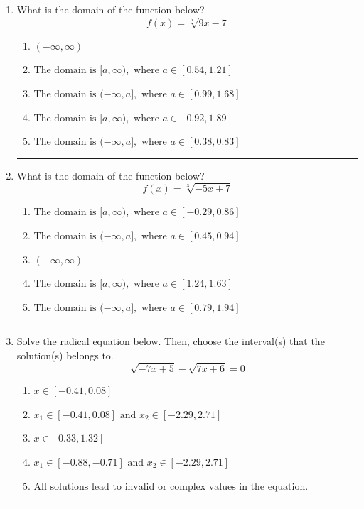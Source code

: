 \documentclass[14pt]{extbook}
\newcommand{\litem}[1]{\item#1\hspace*{-1cm}\rule{\textwidth}{0.4pt}}
\begin{document}
\begin{enumerate}
{\begin{enumerate}[label=\Alph*.]
\end{enumerate} }
\litem{
What is the domain of the function below?\[ f(x) = \sqrt[5]{9 x - 7} \]\begin{enumerate}[label=\Alph*.]
\item \( (-\infty, \infty) \)
\item \( \text{The domain is } [a, \infty), \text{   where } a \in [0.54, 1.21] \)
\item \( \text{The domain is } (-\infty, a], \text{   where } a \in [0.99, 1.68] \)
\item \( \text{The domain is } [a, \infty), \text{   where } a \in [0.92, 1.89] \)
\item \( \text{The domain is } (-\infty, a], \text{   where } a \in [0.38, 0.83] \)

\end{enumerate} }
\litem{
What is the domain of the function below?\[ f(x) = \sqrt[3]{-5 x + 7} \]\begin{enumerate}[label=\Alph*.]
\item \( \text{The domain is } [a, \infty), \text{   where } a \in [-0.29, 0.86] \)
\item \( \text{The domain is } (-\infty, a], \text{   where } a \in [0.45, 0.94] \)
\item \( (-\infty, \infty) \)
\item \( \text{The domain is } [a, \infty), \text{   where } a \in [1.24, 1.63] \)
\item \( \text{The domain is } (-\infty, a], \text{   where } a \in [0.79, 1.94] \)

\end{enumerate} }
\litem{
Solve the radical equation below. Then, choose the interval(s) that the solution(s) belongs to.\[ \sqrt{-7 x + 5} - \sqrt{7 x + 6} = 0 \]\begin{enumerate}[label=\Alph*.]
\item \( x \in [-0.41,0.08] \)
\item \( x_1 \in [-0.41, 0.08] \text{ and } x_2 \in [-2.29,2.71] \)
\item \( x \in [0.33,1.32] \)
\item \( x_1 \in [-0.88, -0.71] \text{ and } x_2 \in [-2.29,2.71] \)
\item \( \text{All solutions lead to invalid or complex values in the equation.} \)


\end{enumerate}}
\end{enumerate}
\end{document}
